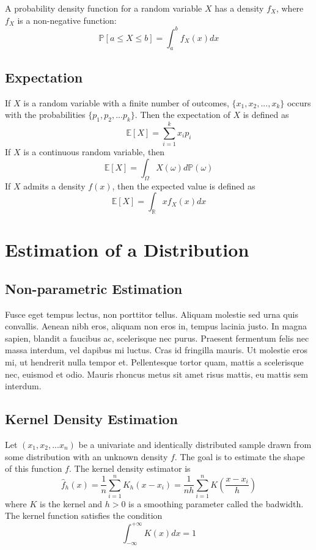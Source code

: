 A probability density function for a random variable $X$ has a density $f_X$, where $f_X$ is a non-negative function:
\begin{equation}
  \mathbb{P}[a \leq X \leq b]=\int_{a}^{b}f_{X}(x)dx
\end{equation}

\subsection{Expectation}
If $X$ is a random variable with a finite number of outcomes, $\{x_1,x_2,...,x_k\}$ occurs with the probabilities $\{p_1,p_2,...p_k\}$.  Then the expectation of $X$ is defined as
\begin{equation}
  \mathbb{E}[X]=\sum_{i=1}^{k}x_i p_i
\end{equation}
If $X$ is a continuous random variable, then
\begin{equation}
  \mathbb{E}[X]=\int_{\Omega} X(\omega) d\mathbb{P}(\omega)
\end{equation}
If $X$ admits a density $f(x)$, then the expected value is defined as
\begin{equation}
  \mathbb{E}[X]=\int_{\mathbb{R}}x f_{X}(x) dx
\end{equation}

\section{Estimation of a Distribution}

\subsection{Non-parametric Estimation}
 Fusce eget tempus lectus, non porttitor tellus. Aliquam molestie sed urna quis convallis. Aenean nibh eros, aliquam non eros in, tempus lacinia justo. In magna sapien, blandit a faucibus ac, scelerisque nec purus. Praesent fermentum felis nec massa interdum, vel dapibus mi luctus. Cras id fringilla mauris. Ut molestie eros mi, ut hendrerit nulla tempor et. Pellentesque tortor quam, mattis a scelerisque nec, euismod et odio. Mauris rhoncus metus sit amet risus mattis, eu mattis sem interdum.

\subsection{Kernel Density Estimation}
Let $(x_1,x_2,...x_n)$ be a univariate and identically distributed sample drawn from some distribution with an unknown density $f$.  The goal is to estimate the shape of this function $f$.  The kernel density estimator is
\begin{equation}
  \hat{f}_h(x)=\frac{1}{n}\sum_{i=1}^{n}K_h(x-x_i)
    =\frac{1}{nh}\sum_{i=1}^{n}K\left(\frac{x-x_i}{h}\right)
\end{equation}
where $K$ is the kernel and $h>0$ is a smoothing parameter called the badwidth.  The kernel function satisfies the condition
\begin{equation}
  \int_{-\infty}^{+\infty}K(x)dx=1
\end{equation}
